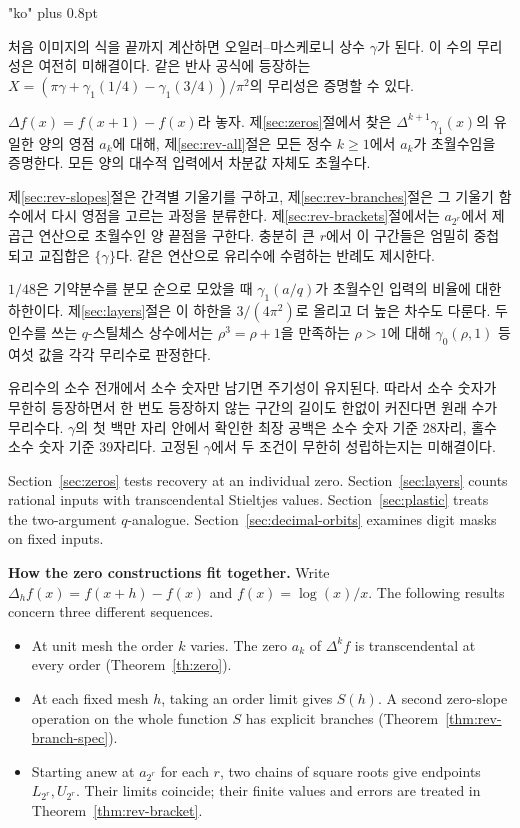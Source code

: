 \documentclass[11pt,a4paper]{article}
\theoremstyle{definition}\newtheorem{definition}[theorem]{Definition}\newtheorem{example}[theorem]{Example}
\theoremstyle{remark}\newtheorem{remark}[theorem]{Remark}
\begin{document}
{\korean\XeTeXlinebreaklocale "ko"\XeTeXlinebreakskip=0pt plus 0.8pt
\par\smallskip
처음 이미지의 식을 끝까지 계산하면 오일러–마스케로니 상수 $\gamma$가 된다. 이 수의 무리성은 여전히 미해결이다. 같은 반사 공식에 등장하는 $X=(\pi\gamma+\gamma_1(1/4)-\gamma_1(3/4))/\pi^2$의 무리성은 증명할 수 있다.\par\smallskip
$\Delta f(x)=f(x+1)-f(x)$라 놓자. 제\ref{sec:zeros}절에서 찾은 $\Delta^{k+1}\gamma_1(x)$의 유일한 양의 영점 $a_k$에 대해, 제\ref{sec:rev-all}절은 모든 정수 $k\ge1$에서 $a_k$가 초월수임을 증명한다. 모든 양의 대수적 입력에서 차분값 자체도 초월수다.\par\smallskip
제\ref{sec:rev-slopes}절은 간격별 기울기를 구하고, 제\ref{sec:rev-branches}절은 그 기울기 함수에서 다시 영점을 고르는 과정을 분류한다. 제\ref{sec:rev-brackets}절에서는 $a_{2^r}$에서 제곱근 연산으로 초월수인 양 끝점을 구한다. 충분히 큰 $r$에서 이 구간들은 엄밀히 중첩되고 교집합은 $\{\gamma\}$다. 같은 연산으로 유리수에 수렴하는 반례도 제시한다.\par\smallskip
$1/48$은 기약분수를 분모 순으로 모았을 때 $\gamma_1(a/q)$가 초월수인 입력의 비율에 대한 하한이다. 제\ref{sec:layers}절은 이 하한을 $3/(4\pi^2)$로 올리고 더 높은 차수도 다룬다. 두 인수를 쓰는 $q$-스틸체스 상수에서는 $\rho^3=\rho+1$을 만족하는 $\rho>1$에 대해 $\gamma_0(\rho,1)$ 등 여섯 값을 각각 무리수로 판정한다.\par\smallskip
유리수의 소수 전개에서 소수 숫자만 남기면 주기성이 유지된다. 따라서 소수 숫자가 무한히 등장하면서 한 번도 등장하지 않는 구간의 길이도 한없이 커진다면 원래 수가 무리수다. $\gamma$의 첫 백만 자리 안에서 확인한 최장 공백은 소수 숫자 기준 28자리, 홀수 소수 숫자 기준 39자리다. 고정된 $\gamma$에서 두 조건이 무한히 성립하는지는 미해결이다.\par}
\else
Section~\ref{sec:zeros} tests recovery at an individual zero. Section~\ref{sec:layers} counts rational inputs with transcendental Stieltjes values. Section~\ref{sec:plastic} treats the two-argument $q$-analogue. Section~\ref{sec:decimal-orbits} examines digit masks on fixed inputs.
\fi


\clearpage
\tableofcontents
\medskip
\noindent\textbf{How the zero constructions fit together.}\quad
Write $\Delta_h f(x)=f(x+h)-f(x)$ and $f(x)=\log(x)/x$. The following results concern three different sequences.
\begin{itemize}
\item At unit mesh the order $k$ varies. The zero $a_k$ of $\Delta^k f$ is transcendental at every order (Theorem~\ref{th:zero}).
\item At each fixed mesh $h$, taking an order limit gives $S(h)$. A second zero-slope operation on the whole function $S$ has explicit branches (Theorem~\ref{thm:rev-branch-spec}).
\item Starting anew at $a_{2^r}$ for each $r$, two chains of square roots give endpoints $L_{2^r},U_{2^r}$. Their limits coincide; their finite values and errors are treated in Theorem~\ref{thm:rev-bracket}.
\end{itemize}
\clearpage
\end{document}
